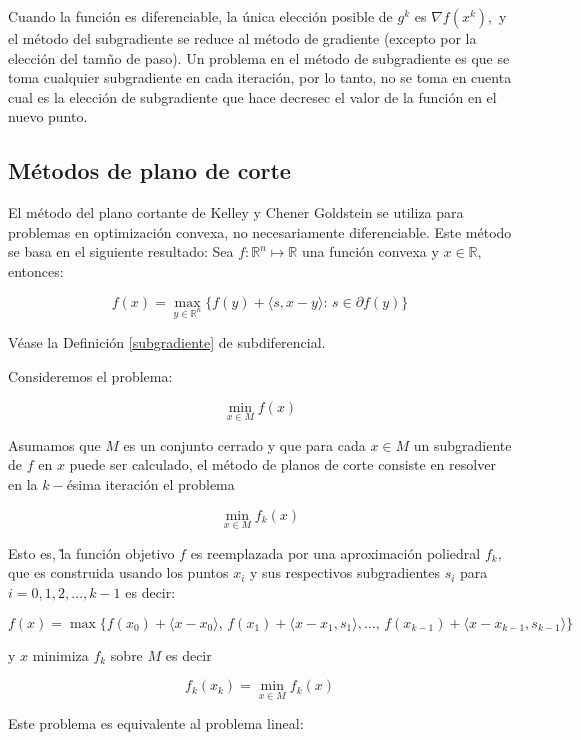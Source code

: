 Cuando la funci\'on es diferenciable, la \'unica elecci\'on posible de $g^k$ es $ \nabla f(x^k),$ y el m\'etodo del subgradiente se reduce al
m\'etodo de gradiente (excepto por la elecci\'on del tam\~no de paso). Un problema en el m\'etodo de subgradiente es que se toma cualquier
subgradiente en cada iteraci\'on, por lo tanto, no se toma en cuenta cual es la elecci\'on de subgradiente que hace decresec el valor de la
funci\'on en el nuevo punto.%


\subsection{M\'etodos de plano de corte}

El m\'etodo del plano cortante de Kelley y Chener Goldstein se utiliza para problemas en optimizaci\'on convexa, no necesariamente 
diferenciable. Este m\'etodo se basa en el siguiente resultado: Sea $f: \mathbb{R}^n \longmapsto \mathbb{R} $ una funci\'on convexa y 
$x \in \mathbb{R},$ entonces:

 \[f(x) = \max_{y \in \mathbb{R}^n} \{f(y) + \langle s, x - y\rangle: \, s \in \partial f(y)\}\]

V\'ease la Definici\'on \ref{subgradiente} de subdiferencial.\medskip

Consideremos el problema:

$$\min_{x \in M} f(x)$$

Asumamos que $M$ es un conjunto cerrado y que para cada $x \in M $ un subgradiente de $f $ en $x $ puede ser calculado, el m\'etodo de planos 
de corte consiste en resolver en la $k-$\'esima iteraci\'on el problema

$$\min_{x \in M} f_k(x)$$

Esto es, \~la funci\'on objetivo $f $ es reemplazada por una aproximaci\'on poliedral $f_k,$ que es construida usando los puntos $x_i $ y sus
respectivos subgradientes $s_i $ para $i = 0, 1, 2, \ldots , k - 1 $ es decir:

$$f(x) = \max \{f(x_0) + \langle x - x_0 \rangle,\, f(x_1) + \langle x - x_1, s_1\rangle, \dots ,\, f(x_{k - 1}) +
\langle x - x_{k - 1}, s_{k - 1}\rangle \}$$

y $x $ minimiza $f_k $ sobre $M $ es decir

$$f_k(x_k) = \min_{x \in M} f_k(x)$$


Este problema es equivalente al problema lineal:

